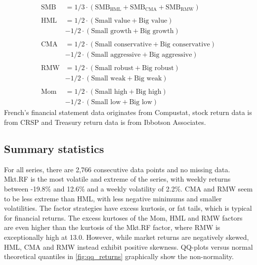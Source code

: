 \begin{align*}
  \text{SMB} &= 1/3 \cdot (\text{SMB}_\text{HML} + \text{SMB}_\text{CMA} + \text{SMB}_\text{RMW}) \\
  \\
  \text{HML} &= 1/2 \cdot (\text{Small value} + \text{Big value})   \\
             &- 1/2 \cdot (\text{Small growth} + \text{Big growth}) \\
  \\
  \text{CMA} &= 1/2 \cdot (\text{Small conservative} + \text{Big conservative}) \\
             &- 1/2 \cdot (\text{Small aggressive} + \text{Big aggressive}) \\
  \\
  \text{RMW} &= 1/2 \cdot (\text{Small robust} + \text{Big robust}) \\
             &- 1/2 \cdot (\text{Small weak} + \text{Big weak}) \\
  \\
  \text{Mom} &= 1/2 \cdot (\text{Small high} + \text{Big high}) \\
             &- 1/2 \cdot (\text{Small low} + \text{Big low})
\end{align*}
French's financial statement data originates from Compustat, stock return data is from CRSP and Treasury return data is from Ibbotson Associates.

\subsection{Summary statistics}



For all series, there are 2,766 consecutive data points and no missing data. Mkt.RF is the most volatile and extreme of the series, with weekly returns between -19.8\% and 12.6\% and a weekly volatility of 2.2\%. CMA and RMW seem to be less extreme than HML, with less negative minimums and smaller volatilities. The factor strategies have excess kurtosis, or fat tails, which is typical for financial returns. The excess kurtoses of the Mom, HML and RMW factors are even higher than the kurtosis of the Mkt.RF factor, where RMW is exceptionally high at 13.0. However, while market returns are negatively skewed, HML, CMA and RMW instead exhibit positive skewness. QQ-plots versus normal theoretical quantiles in \autoref{fig:qq_returns} graphically show the non-normality.

